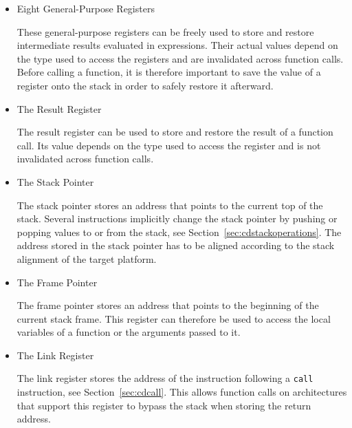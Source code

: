 \begin{itemize}

\item Eight General-Purpose Registers\alignright{}\nopagebreak

These general-purpose registers can be freely used to store and restore intermediate results evaluated in expressions.
Their actual values depend on the type used to access the registers and are invalidated across function calls.
Before calling a function, it is therefore important to save the value of a register onto the stack in order to safely restore it afterward.

\item The Result Register\alignright{}\nopagebreak

The result register can be used to store and restore the result of a function call.
Its value depends on the type used to access the register and is not invalidated across function calls.

\item The Stack Pointer\alignright{}\nopagebreak

The stack pointer stores an address that points to the current top of the stack.
Several instructions implicitly change the stack pointer by pushing or popping values to or from the stack, see Section~\ref{sec:cdstackoperations}.
The address stored in the stack pointer has to be aligned according to the stack alignment of the target platform.

\item The Frame Pointer\alignright{}\nopagebreak

The frame pointer stores an address that points to the beginning of the current stack frame.
This register can therefore be used to access the local variables of a function or the arguments passed to it.

\item The Link Register\alignright{}\nopagebreak

The link register stores the address of the instruction following a \texttt{call} instruction, see Section~\ref{sec:cdcall}.
This allows function calls on architectures that support this register to bypass the stack when storing the return address.

\end{itemize}

